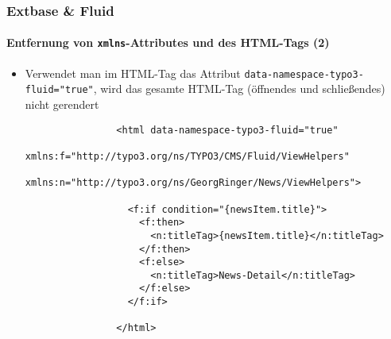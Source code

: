 \begin{frame}[fragile]
	\frametitle{Extbase \& Fluid}
	\framesubtitle{Entfernung von \texttt{xmlns}-Attributes und des HTML-Tags (2)}

	\lstset{basicstyle=\tiny\ttfamily}

	\begin{itemize}

		\item Verwendet man im HTML-Tag das Attribut
			\texttt{data-namespace-typo3-fluid="true"}, wird das gesamte
			 HTML-Tag (öffnendes und schließendes) nicht gerendert

			\begin{lstlisting}
				<html data-namespace-typo3-fluid="true"
				  xmlns:f="http://typo3.org/ns/TYPO3/CMS/Fluid/ViewHelpers"
				  xmlns:n="http://typo3.org/ns/GeorgRinger/News/ViewHelpers">

				  <f:if condition="{newsItem.title}">
				    <f:then>
				      <n:titleTag>{newsItem.title}</n:titleTag>
				    </f:then>
				    <f:else>
				      <n:titleTag>News-Detail</n:titleTag>
				    </f:else>
				  </f:if>

				</html>
			\end{lstlisting}

	\end{itemize}

\end{frame}


